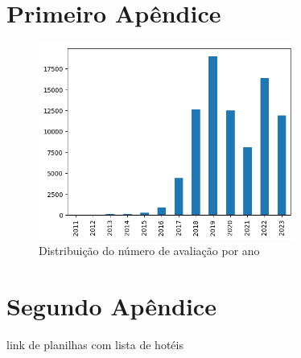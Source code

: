 
\begin{apendicesenv}

\partapendices

\chapter{Primeiro Apêndice}

\begin{figure}
  \centering
  \includegraphics[width=0.75\textwidth]{figs/exploratoria/distribuicao_ano_avaliacao.png}
  \caption{Distribuição do número de avaliação por ano}
  \label{img:dist_ano_avaliacao}
\end{figure}

\chapter{Segundo Apêndice}
\label{apendice:lista_completa_hoteis}

link de planilhas com lista de hotéis
\end{apendicesenv}

